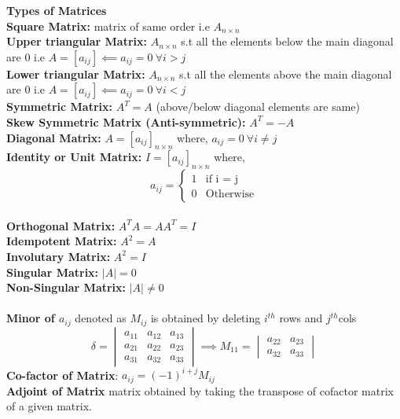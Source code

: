 \documentclass[12pt]{article}
\begin{document}
\textbf{Types of Matrices}\\
\textbf{Square Matrix: } matrix of same order i.e $A_{n \times n}$\\
\textbf{Upper triangular Matrix: } $A_{n \times n}$ s.t all the elements below the main diagonal are $0$ i.e $A = [a_{ij}] \impliedby a_{ij}=0\: \forall i>j$\\
\textbf{Lower triangular Matrix: } $A_{n \times n}$ s.t all the elements above the main diagonal are $0$ i.e $A = [a_{ij}] \impliedby a_{ij}=0\: \forall i<j$\\
\textbf{Symmetric Matrix: } $A^T = A$ (above/below diagonal elements are same)\\
\textbf{Skew Symmetric Matrix (Anti-symmetric): } $A^T=-A$\\
\textbf{Diagonal Matrix: } $A = [a_{ij}]_{n \times n}$ where, $a_{ij}=0\: \forall i\not = j$\\
\textbf{Identity or Unit Matrix: } $I = [a_{ij}]_{n \times n}$ where, 
\[ 
a_{ij}= \begin{cases}
	1 & \text{if i = j}\\
	0 & \text{Otherwise}
\end{cases}
\]\\
\textbf{Orthogonal Matrix: } $A^TA = AA^T=I$\\
\textbf{Idempotent Matrix: } $A^2 = A$\\
\textbf{Involutary Matrix: } $A^2 = I$\\
\textbf{Singular Matrix: } $|A| = 0$\\
\textbf{Non-Singular Matrix: } $|A| \not= 0$\\
\\
\textbf{Minor of $a_{ij}$} denoted as $M_{ij}$ is obtained by deleting $i^{th}$ rows and $j^{th}$cols\\
\[
	\delta = \begin{vmatrix}
	a_{11} & a_{12} & a_{13} \\
	a_{21} & a_{22} & a_{23} \\
	a_{31} & a_{32} & a_{33} 
	\end{vmatrix}
	\implies
	M_{11} = \begin{vmatrix}
	 a_{22} & a_{23} \\
	 a_{32} & a_{33}
	\end{vmatrix}
\]
\textbf{Co-factor of Matrix}: $a_{ij} = (-1)^{i+j} M_{ij}$\\
\textbf{Adjoint of Matrix } matrix obtained by taking the transpose of cofactor matrix of a given matrix.\\
\end{document}
